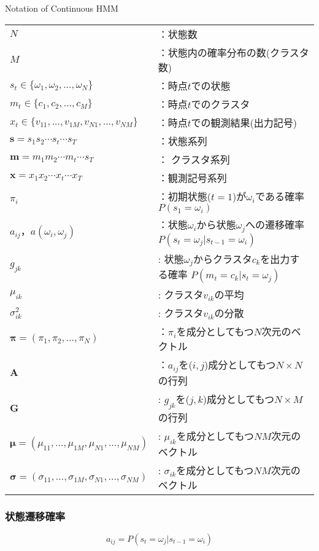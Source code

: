 \begin{myframe}{Notation of Continuous HMM}
	\begin{tabular}{ll}
		$N$ & ：状態数 \\
		$M$ & ：状態内の確率分布の数(クラスタ数) \\
		$s_{t} \in \{\omega_{1}, \omega_{2},..., \omega_{N}\}$ & ：時点$t$での状態 \\
    $m_{t} \in \{c_{1}, c_{2}, ..., c_{M}\}$ & ：時点$t$でのクラスタ \\
		$x_{t} \in \{v_{11}, ..., v_{1M}, v_{N1}, ..., v_{NM}\}$ & ：時点$t$での観測結果(出力記号) \\
		$\mathbf{s} = s_{1}s_{2}\cdots s_{t} \cdots s_{T}$ & ：状態系列 \\
    $\mathbf{m} = m_{1}m_{2}\cdots m_{t} \cdots s_{T}$ & ： クラスタ系列\\
		$\mathbf{x} = x_{1}x_{2}\cdots x_{t} \cdots x_{T}$ & ：観測記号系列 \\
    $\pi_{i}$ & ：初期状態($t=1$)が$\omega_{i}$である確率 $P(s_{1} = \omega_{i})$ \\
		$a_{ij}，a(\omega_{i}, \omega_{j})$ & ：状態$\omega_{i}$から状態$\omega_{j}$への遷移確率 $P(s_{t} = \omega_{j} | s_{t-1} = \omega_{i})$ \\
    $g_{jk}$ &  : 状態$\omega_{j}$からクラスタ$c_{k}$を出力する確率 $P(m_{t} = c_{k} | s_{t} = \omega_{j})$ \\
    $\mu_{ik}$ & : クラスタ$v_{ik}$の平均 \\
    $\sigma_{ik}^{2}$ & : クラスタ$v_{ik}$の分散 \\
    $\bm{\pi}=(\pi_{1}, \pi_{2}, ..., \pi_{N})$ & ：$\pi_{i}$を成分としてもつ$N$次元のベクトル \\
		$\bm{A}$ & ：$a_{ij}$を($i,j$)成分としてもつ$N \times N$の行列 \\
    $\bm{G}$ & : $g_{jk}$を($j,k$)成分としてもつ$N \times M$の行列 \\
    $\bm{\mu} = (\mu_{11}, ..., \mu_{1M}, \mu_{N1}, ..., \mu_{NM})$ & : $\mu_{ik}$を成分としてもつ$NM$次元のベクトル \\
    $\bm{\sigma} = (\sigma_{11}, ..., \sigma_{1M}, \sigma_{N1}, ..., \sigma_{NM})$ & : $\sigma_{ik}$を成分としてもつ$NM$次元のベクトル \\
	\end{tabular}
\end{myframe}

\subsubsection{状態遷移確率}
\begin{equation}
	a_{ij} = P(s_{t} = \omega_{j} | s_{t-1} = \omega_{i})
\end{equation}

